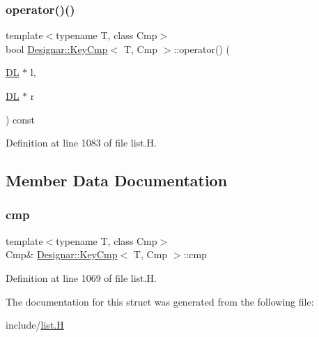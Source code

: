 \subsubsection{\texorpdfstring{operator()()}{operator()()}}
{\footnotesize\ttfamily template$<$typename T, class Cmp$>$ \\
bool \hyperlink{struct_designar_1_1_key_cmp}{Designar\+::\+Key\+Cmp}$<$ T, Cmp $>$\+::operator() (\begin{DoxyParamCaption}\item[{\hyperlink{class_designar_1_1_d_l}{DL} $\ast$}]{l,  }\item[{\hyperlink{class_designar_1_1_d_l}{DL} $\ast$}]{r }\end{DoxyParamCaption}) const\hspace{0.3cm}{\ttfamily [inline]}}



Definition at line 1083 of file list.\+H.



\subsection{Member Data Documentation}
\mbox{\label{struct_designar_1_1_key_cmp_a459613d03deb91c821f26cfafdd93dab}} 
\subsubsection{\texorpdfstring{cmp}{cmp}}
{\footnotesize\ttfamily template$<$typename T, class Cmp$>$ \\
Cmp\& \hyperlink{struct_designar_1_1_key_cmp}{Designar\+::\+Key\+Cmp}$<$ T, Cmp $>$\+::cmp}



Definition at line 1069 of file list.\+H.



The documentation for this struct was generated from the following file\+:\begin{DoxyCompactItemize}
\item 
include/\hyperlink{list_8_h}{list.\+H}\end{DoxyCompactItemize}
